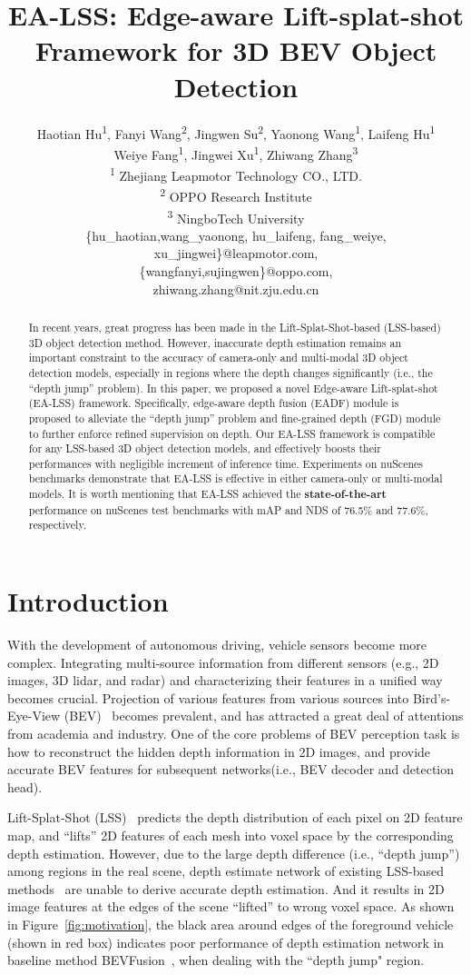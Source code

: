 \documentclass[letterpaper]{article} \usepackage[submission]{aaai24}  \usepackage{times}  \usepackage{helvet}  \usepackage{courier}  \usepackage[hyphens]{url}  \usepackage{graphicx} \urlstyle{rm} \def\UrlFont{\rm}  \usepackage{natbib}  \usepackage{caption} \frenchspacing  \setlength{\pdfpagewidth}{8.5in} \setlength{\pdfpageheight}{11in} \usepackage{algorithm}
\title{EA-LSS: Edge-aware Lift-splat-shot Framework for 3D BEV Object Detection}
\author{
Haotian Hu\textsuperscript{\rm 1}, Fanyi Wang\textsuperscript{\rm 2}\equalcontrib, Jingwen Su\textsuperscript{\rm 2}, Yaonong Wang\textsuperscript{\rm 1}, Laifeng Hu\textsuperscript{\rm 1} \\ Weiye Fang\textsuperscript{\rm 1}, Jingwei Xu\textsuperscript{\rm 1}, Zhiwang Zhang\textsuperscript{\rm 3}\equalcontrib \\
    \small
    \textsuperscript{\rm 1} Zhejiang Leapmotor Technology CO., LTD.\\
    \textsuperscript{\rm 2} OPPO Research Institute\\
    \textsuperscript{\rm 3} NingboTech University\\
    \{hu\_haotian,wang\_yaonong, hu\_laifeng, fang\_weiye, xu\_jingwei\}@leapmotor.com, \\ \{wangfanyi,sujingwen\}@oppo.com,\\  zhiwang.zhang@nit.zju.edu.cn
}
\begin{document}
\maketitle



\begin{abstract}
   In recent years, great progress has been made in the Lift-Splat-Shot-based (LSS-based) 3D object detection method.
   However, inaccurate depth estimation remains an important constraint to the accuracy of camera-only and multi-modal 3D object detection models, especially in regions where the depth changes significantly (i.e., the ``depth jump'' problem).
   In this paper, we proposed a novel Edge-aware Lift-splat-shot (EA-LSS) framework. Specifically, edge-aware depth fusion (EADF) module is proposed to alleviate the ``depth jump'' problem and fine-grained depth (FGD) module to further enforce refined supervision on depth. 
   Our EA-LSS framework is compatible for any LSS-based 3D object detection models, and effectively boosts their performances with negligible increment of inference time. 
   Experiments on nuScenes benchmarks demonstrate that EA-LSS is effective in either camera-only or multi-modal models. It is worth mentioning that EA-LSS achieved the \textbf{state-of-the-art} performance on nuScenes test benchmarks with mAP and NDS of 76.5\% and 77.6\%, respectively.
\end{abstract}

\section{Introduction}

With the development of autonomous driving, vehicle sensors become more complex. Integrating multi-source information from different sensors (e.g., 2D images, 3D lidar, and radar) and characterizing their features in a unified way becomes crucial. Projection of various features from various sources into Bird's-Eye-View (BEV)~\cite{bai2022transfusion,huang2021bevdet,li2022bevdepth,liu2022bevfusion} becomes prevalent, and has attracted a great deal of attentions from academia and industry. One of the core problems of BEV perception task is how to reconstruct the hidden depth information in 2D images, and provide accurate BEV features for subsequent networks(i.e., BEV decoder and detection head).

Lift-Splat-Shot (LSS)~\cite{philion2020lss} predicts the depth distribution of each pixel on 2D feature map, and ``lifts'' 2D features of each mesh into voxel space by the corresponding depth estimation. However, due to the large depth difference (i.e., ``depth jump'') among regions in the real scene, 
depth estimate network of existing LSS-based methods~\cite{huang2021bevdet, li2022bevdepth, liang2022bevfusion, liu2022bevfusion} are unable to derive accurate depth estimation.
And it results in 2D image features at the edges of the scene ``lifted'' to wrong voxel space. As shown in Figure~\ref{fig:motivation}, the black area around edges of the foreground vehicle (shown in red box) indicates poor performance of depth estimation network in baseline method BEVFusion~\cite{liang2022bevfusion}, when dealing with the ``depth jump" region.
\end{document}
